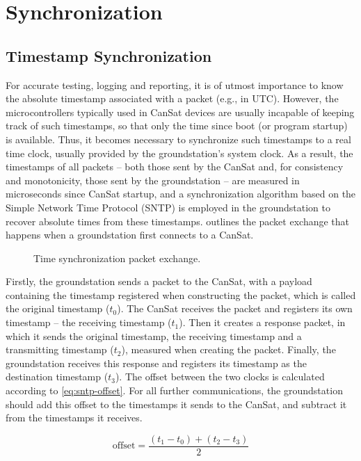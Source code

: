 \documentclass[a4paper,11pt,english]{article}
\begin{document}
\section[sync]{Synchronization}

\subsection[sync:time]{Timestamp Synchronization}
For accurate testing, logging and reporting, it is of utmost importance to know the absolute timestamp associated with a packet (e.g., in UTC). However, the microcontrollers typically used in CanSat devices are usually incapable of keeping track of such timestamps, so that only the time since boot (or program startup) is available. Thus, it becomes necessary to synchronize such timestamps to a real time clock, usually provided by the groundstation's system clock. As a result, the timestamps of all packets -- both those sent by the CanSat and, for consistency and monotonicity, those sent by the groundstation -- are measured in microseconds since CanSat startup, and a synchronization algorithm based on the Simple Network Time Protocol (SNTP) is employed in the groundstation to recover absolute times from  these timestamps.  outlines the packet exchange that happens when a groundstation first connects to a CanSat.

\begin{figure}[h]
  \centering
  \caption{Time synchronization packet exchange.}\label{fig:time-exchange}
\end{figure}

Firstly, the groundstation sends a packet to the CanSat, with a payload containing the timestamp registered when constructing the packet, which is called the original timestamp ($t_0$). The CanSat receives the packet and registers its own timestamp -- the receiving timestamp ($t_1$). Then it creates a response packet, in which it sends the original timestamp, the receiving timestamp and a transmitting timestamp ($t_2$), measured when creating the packet. Finally, the groundstation receives this response and registers its timestamp as the destination timestamp ($t_3$). The offset between the two clocks is calculated according to \cref{eq:sntp-offset}. For all further communications, the groundstation should add this offset to the timestamps it sends to the CanSat, and subtract it from the timestamps it receives.

\begin{equation}\label{eq:sntp-offset}
  \textrm{offset} = \frac{\left( t_1 - t_0 \right) + \left( t_2 - t_3 \right)}{2}
\end{equation}
\end{document}
